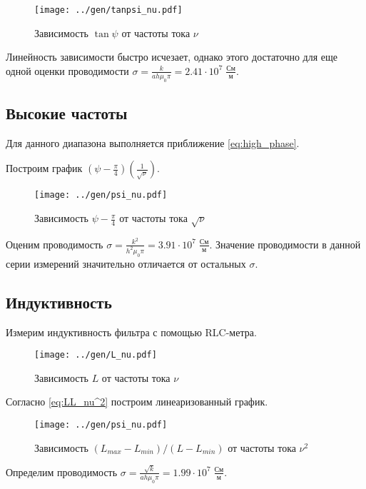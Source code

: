 \begin{figure}[H]
	\centering
	\texttt{[image: ../gen/tanpsi\_nu.pdf]}
	\caption{Зависимость $\tan \psi$ от частоты тока $\nu$}
	\label{fig:tanpsi_nu}
\end{figure}

Линейность зависимости быстро исчезает, однако этого достаточно для еще одной оценки проводимости $\sigma = \frac{k}{a h \mu_0 \pi} = 2.41 \cdot 10^7 \; \frac{\text{См}}{\text{м}}$.

\subsection*{Высокие частоты}

Для данного диапазона выполняется приближение \ref{eq:high_phase}.

Построим график $(\psi - \frac{\pi}{4}) (\frac{1}{\sqrt{\nu}})$.

\begin{figure}[H]
	\centering
	\texttt{[image: ../gen/psi\_nu.pdf]}
	\caption{Зависимость $\psi - \frac{\pi}{4}$ от частоты тока $\sqrt{\nu}$}
	\label{fig:psi_nu}
\end{figure}

Оценим проводимость $\sigma = \frac{k^2}{h^2 \mu_0 \pi}= 3.91 \cdot 10^7 \; \frac{\text{См}}{\text{м}}$.
Значение проводимости в данной серии измерений значительно отличается от остальных $\sigma$.

\subsection*{Индуктивность}

Измерим индуктивность фильтра с помощью RLC-метра. 

\begin{figure}[H]
	\centering
	\texttt{[image: ../gen/L\_nu.pdf]}
	\caption{Зависимость $L$ от частоты тока $\nu$}
	\label{fig:L_nu}
\end{figure}

Согласно \ref{eq:LL_nu^2} построим линеаризованный график.

\begin{figure}[H]
	\centering
	\texttt{[image: ../gen/psi\_nu.pdf]}
	\caption{Зависимость $(L_{max} - L_{min})/(L - L_{min})$ от частоты тока $\nu^2$}
	\label{fig:LL_nu^2}
\end{figure}

Определим проводимость $\sigma = \frac{\sqrt{k}}{a h \mu_0 \pi} = 1.99 \cdot 10^7 \; \frac{\text{См}}{\text{м}}$.

